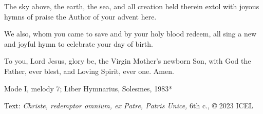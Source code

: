 \hymn



\begin{underhymnverse}
The sky above, the earth, the sea,
and all creation held therein
extol with joyous hymns of praise
the Author of your advent here.

We also, whom you came to save
and by your holy blood redeem,
all sing a new and joyful hymn
to celebrate your day of birth.

To you, Lord Jesus, glory be,
the Virgin Mother’s newborn Son,
with God the Father, ever blest,
and Loving Spirit, ever one. Amen.
\end{underhymnverse}


\begin{hymnsource}
Mode I, melody 7; Liber Hymnarius, Solesmes, 1983*

Text: \emph{Christe, redemptor omnium, ex Patre, Patris Unice,} 6th c., © 2023 ICEL
\end{hymnsource}
